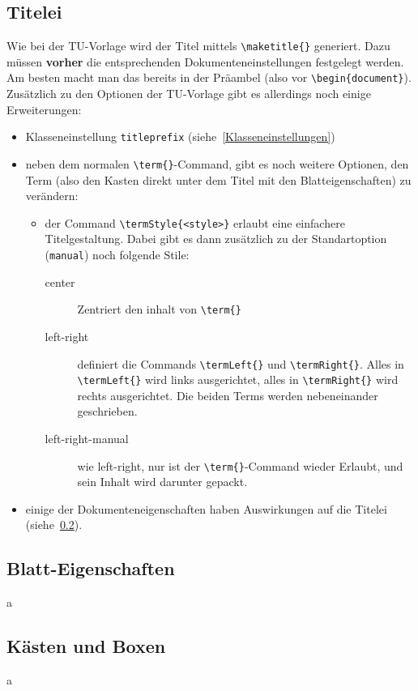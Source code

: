 \documentclass[
    titleprefix=AlgoTeX,
    inlineshortcut=java,
    corporatedesign,
    boxarc,
]{algoexercise}
\begin{document}
    \subsection{Titelei}
    \sloppy
    Wie bei der TU-Vorlage wird der Titel mittels \verb+\maketitle{}+ generiert.
    Dazu müssen \textbf{vorher} die entsprechenden Dokumenteneinstellungen festgelegt werden. Am besten macht man das bereits in der Präambel (also vor \verb+\begin{document}+).
    Zusätzlich zu den Optionen der TU-Vorlage gibt es allerdings noch einige Erweiterungen:
    \begin{itemize}
        \item Klasseneinstellung \verb+titleprefix+ (siehe~\ref{Klasseneinstellungen})
        \item neben dem normalen \verb+\term{}+-Command, gibt es noch weitere Optionen, den Term (also den Kasten direkt unter dem Titel mit den Blatteigenschaften) zu verändern:\begin{itemize}
            \item der Command \verb+\termStyle{<style>}+ erlaubt eine einfachere Titelgestaltung. Dabei gibt es dann zusätzlich zu der Standartoption (\verb+manual+) noch folgende Stile:\begin{description}
                \item[center] Zentriert den inhalt von \verb+\term{}+
                \item[left-right] definiert die Commands \verb+\termLeft{}+ und \verb+\termRight{}+. Alles in \verb+\termLeft{}+ wird links ausgerichtet, alles in \verb+\termRight{}+ wird rechts ausgerichtet. Die beiden Terms werden nebeneinander geschrieben. 
                \item[left-right-manual] wie left-right, nur ist der \verb+\term{}+-Command wieder Erlaubt, und sein Inhalt wird darunter gepackt.
            \end{description}
        \end{itemize}
        \item einige der Dokumenteneigenschaften haben Auswirkungen auf die Titelei (siehe~\ref{sheet-properties}).
    \end{itemize}
    \subsection{Blatt-Eigenschaften}\label{sheet-properties}
    a
    \subsection{Kästen und Boxen}\label{boxes}
    a
    \clearpage{}
\end{document}
